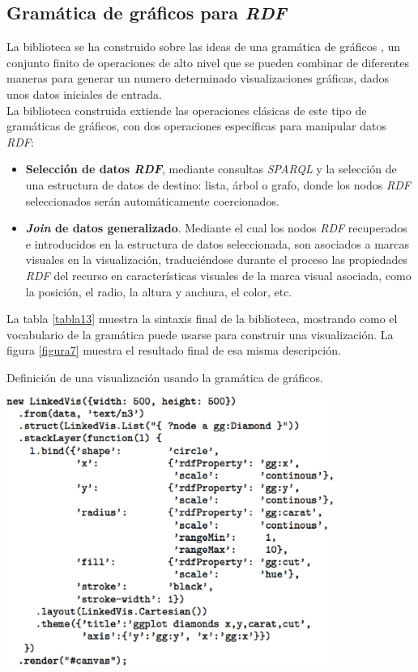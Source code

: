 \subsection{Gram\'atica de gr\'aficos para \textit{RDF}}

La biblioteca se ha construido sobre las ideas de una gram\'atica de gr\'aficos \cite{wilkinson2012grammar}, un conjunto finito de operaciones de alto nivel que se pueden combinar de diferentes maneras para generar un numero determinado visualizaciones gr\'aficas, dados unos datos iniciales de entrada.\\
La biblioteca construida extiende las operaciones cl\'asicas de este tipo de gram\'aticas de gr\'aficos,  con dos operaciones espec\'ificas para manipular datos \textit{RDF}:

\begin{itemize}
\item \textbf{Selecci\'on de datos \textit{RDF}}, mediante consultas \textit{SPARQL} y la selecci\'on de una estructura de datos de destino: lista, \'arbol o grafo, donde los nodos \textit{RDF} seleccionados ser\'an autom\'aticamente coercionados.
\item \textbf{\textit{Join} de datos generalizado}. Mediante el cual los nodos \textit{RDF} recuperados e introducidos en la estructura de datos seleccionada, son asociados a marcas visuales en la visualizaci\'on, traduci\'endose durante el proceso las propiedades \textit{RDF} del recurso en caracter\'isticas visuales de la marca visual asociada, como la posici\'on, el radio, la altura y anchura, el color, etc.
\end{itemize}

La tabla \ref{tabla13} muestra la sintaxis final de la biblioteca, mostrando como el vocabulario de la gram\'atica puede usarse para construir una visualizaci\'on. La figura \ref{figura7} muestra el resultado final de esa misma descripci\'on.\\

\begin{table}
\vspace{2.4in}
\caption{Definici\'on de una visualizaci\'on usando la gram\'atica de gr\'aficos.}
\vspace{5mm}
\includegraphics[width=0.8\textwidth]{tabla13}
\label{tabla13}
\end{table}

